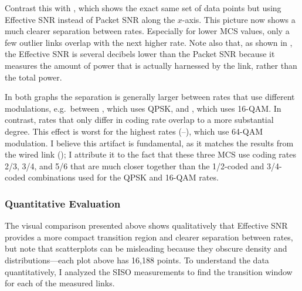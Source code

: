 Contrast this with , which shows the exact same set of data points but using Effective SNR instead of Packet SNR along the $x$-axis. This picture now shows a much clearer separation between rates. Especially for lower MCS values, only a few outlier links overlap with the next higher rate. Note also that, as shown in , the Effective SNR is several decibels lower than the Packet SNR because it measures the amount of power that is actually harnessed by the link, rather than the total power.

In both graphs the separation is generally larger between rates that use different modulations, e.g.\ between , which uses QPSK, and , which uses 16-QAM. In contrast, rates that only differ in coding rate overlap to a more substantial degree. This effect is worst for the highest rates (--), which use 64-QAM modulation. I believe this artifact is fundamental, as it matches the results from the wired link (); I attribute it to the fact that these three MCS use coding rates 2/3, 3/4, and 5/6 that are much closer together than the 1/2-coded and 3/4-coded combinations used for the QPSK and 16-QAM rates.

\subsubsection{Quantitative Evaluation}
The visual comparison presented above shows qualitatively that Effective SNR provides a more compact transition region and clearer separation between rates, but note that scatterplots can be misleading because they obscure density and distributions---each plot above has 16,188 points. To understand the data quantitatively, I analyzed the SISO measurements to find the transition window for each of the measured links.

